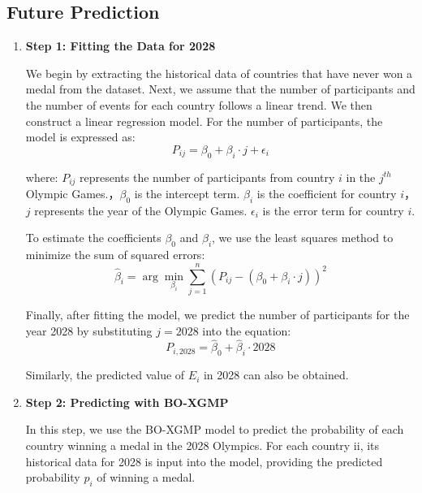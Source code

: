 \documentclass[12pt]{article}  %
\begin{document}
\subsection{Future Prediction}

\begin{enumerate}[\textbullet]
    \item \textbf{Step 1: Fitting the Data for 2028}

    We begin by extracting the historical data of countries that have never won a medal from the dataset. Next, we assume that the number of participants and the number of events for each country follows a linear trend. We then construct a linear regression model. For the number of participants, the model is expressed as:
    \begin{equation}
        P_{ij} = \beta_0 + \beta_i \cdot j + \epsilon_i \tag{14}
    \end{equation}

    where: $P_{ij}$ represents the number of participants from country $i$ in the $j^{th}$ Olympic Games.，$\beta_0$ is the intercept term. $\beta_i$ is the coefficient for country $i$，$j$ represents the year of the Olympic Games. $\epsilon_i$ is the error term for country $i$.

    To estimate the coefficients $\beta_0$ and $\beta_i$, we use the least squares method to minimize the sum of squared errors:
    \begin{equation}
        \hat{\beta}_i = \arg\min_{\beta_i} \sum_{j=1}^{n} \left( P_{ij} - (\beta_0 + \beta_i \cdot j) \right)^2 \tag{15}
    \end{equation}
    

    Finally, after fitting the model, we predict the number of participants for the year 2028 by substituting $j=2028$ into the equation:
    \begin{equation}
        P_{i,2028} = \hat{\beta}_0 + \hat{\beta}_i \cdot 2028 \tag{16}
    \end{equation}

    Similarly, the predicted value of $E_i$ in 2028 can also be obtained.
    
    \item \textbf{Step 2: Predicting with BO-XGMP}

    In this step, we use the BO-XGMP model to predict the probability of each country winning a medal in the 2028 Olympics. For each country ii, its historical data for 2028 is input into the model, providing the predicted probability $p_i$ of winning a medal. 
    

\end{enumerate}
\end{document}
